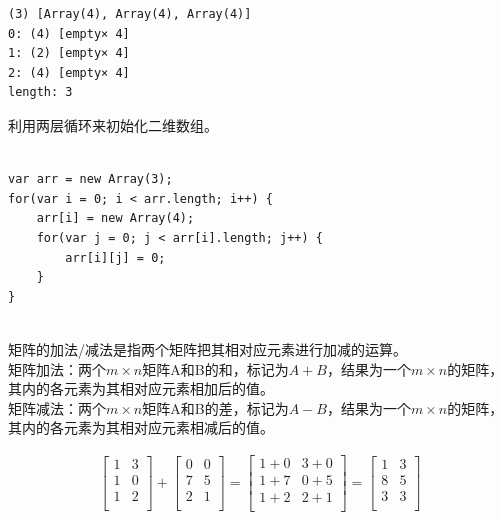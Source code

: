 \begin{tcolorbox}
	\begin{verbatim}
(3) [Array(4), Array(4), Array(4)]
0: (4) [empty× 4]
1: (2) [empty× 4]
2: (4) [empty× 4]
length: 3
	\end{verbatim}
\end{tcolorbox}

利用两层循环来初始化二维数组。\\

\\

\begin{lstlisting}[style=htmlcssjs]
var arr = new Array(3);
for(var i = 0; i < arr.length; i++) {
    arr[i] = new Array(4);
    for(var j = 0; j < arr[i].length; j++) {
        arr[i][j] = 0;
    }
}
\end{lstlisting}

\vspace{0.5cm}

\\

矩阵的加法/减法是指两个矩阵把其相对应元素进行加减的运算。\\

矩阵加法：两个$ m \times n $矩阵A和B的和，标记为$ A + B $，结果为一个$ m \times n $的矩阵，其内的各元素为其相对应元素相加后的值。\\

矩阵减法：两个$ m \times n $矩阵A和B的差，标记为$ A - B $，结果为一个$ m \times n $的矩阵，其内的各元素为其相对应元素相减后的值。

\begin{align}\nonumber
	\left[\begin{matrix}
			1 & 3 \\
			1 & 0 \\
			1 & 2 \\
		\end{matrix} \right]
	+
	\left[\begin{matrix}
			0 & 0 \\
			7 & 5 \\
			2 & 1 \\
		\end{matrix} \right]
	=
	\left[\begin{matrix}
			1+0 & 3+0 \\
			1+7 & 0+5 \\
			1+2 & 2+1 \\
		\end{matrix} \right]
	=
	\left[\begin{matrix}
			1 & 3 \\
			8 & 5 \\
			3 & 3 \\
		\end{matrix} \right]
\end{align}

